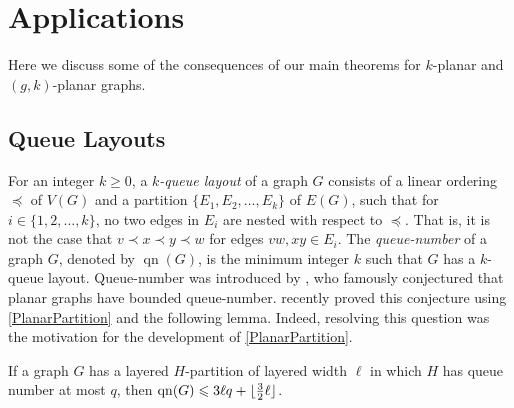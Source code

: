 \documentclass{patmorin}
\DeclareMathOperator{\tw}{tw}
\DeclareMathOperator{\qn}{qn}
\DeclarePairedDelimiter{\floor}{\lfloor}{\rfloor}
\renewcommand{\le}{\leqslant}
\renewcommand{\geq}{\geqslant}
\begin{document}
% 

\section{Applications}
\label{Applications}

Here we discuss some of the consequences of our main theorems for $k$-planar and $(g,k)$-planar graphs. 

\subsection{Queue Layouts}

For an integer $k\geq 0$, a \textit{$k$-queue layout} of a graph $G$ consists of a linear ordering $\preceq$ of $V(G)$ and a partition $\{E_1,E_2,\dots,E_k\}$ of $E(G)$, such that for $i\in\{1,2,\dots,k\}$, no two edges in $E_i$ are nested with respect to $\preceq$. That is, it is not the case that $v\prec x \prec y \prec w$ for edges $vw,xy\in E_i$. The \textit{queue-number} of a graph $G$, denoted by $\qn(G)$, is the minimum integer $k$ such that $G$ has a $k$-queue layout. Queue-number was introduced by \citet{HLR92}, who famously conjectured that planar graphs have bounded queue-number. \citet{dujmovic.joret.ea:planar} recently proved this conjecture using \cref{PlanarPartition} and the following lemma. Indeed, resolving this question was the motivation for the development of \cref{PlanarPartition}.

\begin{lem}
\label{qn}
If a graph $G$ has a layered $H$-partition of layered width $\ell$ in which $H$ has queue number at most $q$, then $\qn(G)\le 3 \ell q + \floor{\tfrac{3}{2}\ell}$.
\end{lem}
\end{document}
